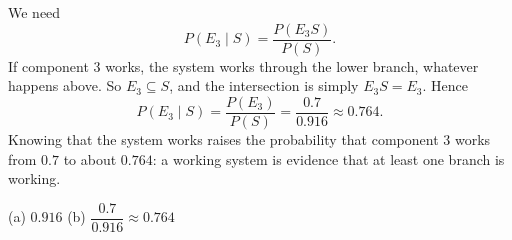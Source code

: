 \begin{solution}
	 We need
	\[ P(E_3\mid S)=\frac{P(E_3S)}{P(S)}. \]
	If component 3 works, the system works through the lower branch, whatever
	happens above. So $E_3\subseteq S$, and the intersection is simply
	$E_3S=E_3$. Hence
	\[ P(E_3\mid S)=\frac{P(E_3)}{P(S)}=\frac{0.7}{0.916}\approx0.764. \]
	Knowing that the system works raises the probability that component 3
	works from $0.7$ to about $0.764$: a working system is evidence that at
	least one branch is working.
	\begin{answer}
		(a) $0.916$ \quad (b) $\dfrac{0.7}{0.916}\approx0.764$
	\end{answer}
\end{solution}
